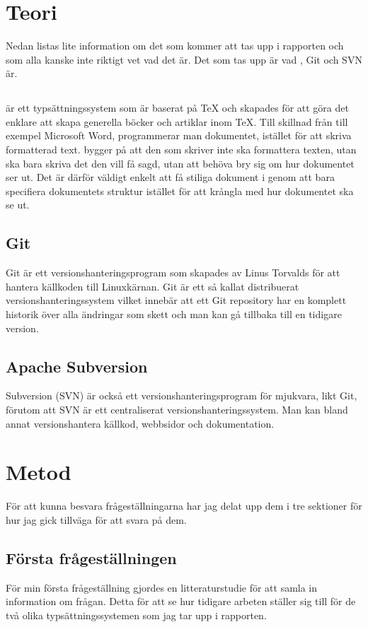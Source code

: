 \section{Teori}
\label{sec:theory-tuhkala}
Nedan listas lite information om det som kommer att tas upp i rapporten och som alla kanske inte riktigt vet vad det är. Det som tas upp är vad \latex, Git och SVN är.

\subsection{\latex}
\latex är ett typsättningssystem som är baserat på TeX och skapades för att göra det enklare att skapa generella böcker och artiklar inom TeX. Till skillnad från till exempel Microsoft Word, programmerar man dokumentet, istället för att skriva formatterad text. \latex bygger på att den som skriver inte ska formattera texten, utan ska bara skriva det den vill få sagd, utan att behöva bry sig om hur dokumentet ser ut.  Det är därför väldigt enkelt att få stiliga dokument i \latex genom att bara specifiera dokumentets struktur istället för att krångla med hur dokumentet ska se ut.

\subsection{Git}
Git är ett versionshanteringsprogram som skapades av Linus Torvalds för att hantera källkoden till Linuxkärnan. Git är ett så kallat distribuerat versionshanteringssystem vilket innebär att ett Git repository har en komplett historik över alla ändringar som skett och man kan gå tillbaka till en tidigare version.

\subsection{Apache Subversion}
Subversion (SVN) är också ett versionshanteringsprogram för mjukvara, likt Git, förutom att SVN är ett centraliserat versionshanteringssystem. Man kan bland annat versionshantera källkod, webbsidor och dokumentation. 

\section{Metod}
\label{sec:method-tuhkala}
För att kunna besvara frågeställningarna har jag delat upp dem i tre sektioner för hur jag gick tillväga för att svara på dem.

\subsection{Första frågeställningen}
För min första frågeställning gjordes en litteraturstudie för att samla in information om frågan. Detta för att se hur tidigare arbeten ställer sig till för de två olika typsättningssystemen som jag tar upp i rapporten.


